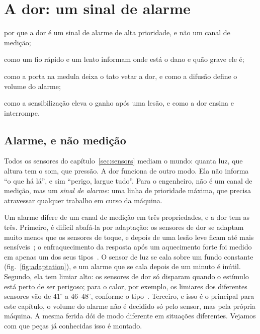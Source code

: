 \chapter{A dor: um sinal de alarme}
\label{sec:pain}
\begin{chaptergoals}
\item por que a dor é um sinal de alarme de alta prioridade, e não um canal de medição;
\item como um fio rápido e um lento informam onde está o dano e quão grave ele é;
\item como a porta na medula deixa o tato vetar a dor, e como a difusão define o volume do alarme;
\item como a sensibilização eleva o ganho após uma lesão, e como a dor ensina e interrompe.
\end{chaptergoals}

\section{Alarme, e não medição}

Todos os sensores do capítulo~\ref{sec:sensors} mediam o mundo: quanta luz, que altura tem o som, que pressão. A dor funciona de outro modo. Ela não informa ``o que há lá'', e sim ``perigo, largue tudo''. Para o engenheiro, não é um canal de medição, mas um \emph{sinal de alarme}: uma linha de prioridade máxima, que precisa atravessar qualquer trabalho em curso da máquina.

Um alarme difere de um canal de medição em três propriedades, e a dor tem as três. Primeiro, é difícil abafá-la por adaptação: os sensores de dor se adaptam muito menos que os sensores de toque, e depois de uma lesão leve ficam até mais sensíveis~\cite{LaMotte1982hyper}; o enfraquecimento da resposta após um aquecimento forte foi medido em apenas um dos seus tipos~\cite{Treede1995heat}. O sensor de luz se cala sobre um fundo constante (fig.~\ref{fig:adaptation}), e um alarme que se cala depois de um minuto é inútil. Segundo, ela tem limiar alto: os sensores de dor só disparam quando o estímulo está perto de ser perigoso; para o calor, por exemplo, os limiares dos diferentes sensores vão de $41^\circ$ a $46$--$48^\circ$, conforme o tipo~\cite{Treede1995heat, Weidner1999cfib}. Terceiro, e isso é o principal para este capítulo, o volume do alarme não é decidido só pelo sensor, mas pela própria máquina. A mesma ferida dói de modo diferente em situações diferentes. Vejamos com que peças já conhecidas isso é montado.

